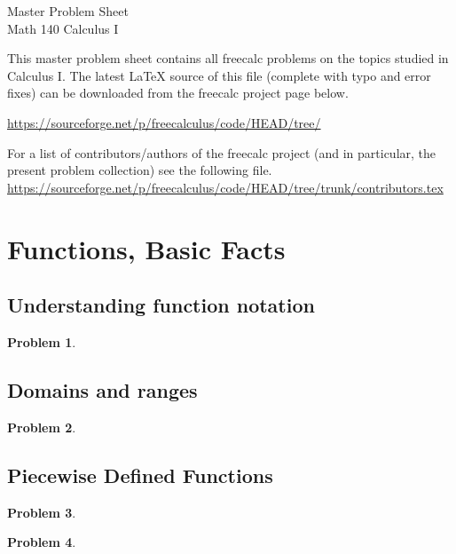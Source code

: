 \documentclass{article}
\newtheorem{problem}{Problem}
\begin{document}
\begin{center}
\Large
Master Problem Sheet \\ Math 140 Calculus I \\ 
\end{center}





This master problem sheet contains all freecalc problems on the topics studied in Calculus I. The latest \LaTeX{} source of this file (complete with typo and error fixes) can be downloaded from the freecalc project page below. 

\url{https://sourceforge.net/p/freecalculus/code/HEAD/tree/}

For a list of contributors/authors of the freecalc project (and in particular, the present problem collection) see the following file.
\url{https://sourceforge.net/p/freecalculus/code/HEAD/tree/trunk/contributors.tex}

\tableofcontents

\section{Functions, Basic Facts}
\subsection{Understanding function notation}
\begin{problem}

\end{problem}
\subsection{Domains and ranges}
\begin{problem}

\end{problem}
\subsection{Piecewise Defined Functions}
\begin{problem}

\end{problem}
\begin{problem}

\end{problem}
\end{document}
